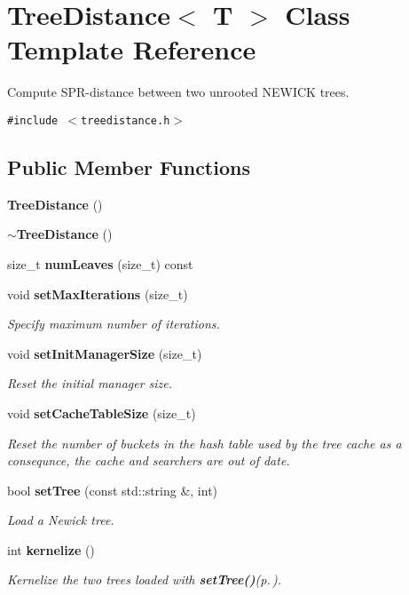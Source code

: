 \section{Tree\-Distance$<$ T $>$ Class Template Reference}
\label{classTreeDistance}
Compute SPR-distance between two unrooted NEWICK trees.  


{\tt \#include $<$treedistance.h$>$}

\subsection*{Public Member Functions}
\begin{CompactItemize}
\item 
{\bf Tree\-Distance} ()
\item 
{\bf $\sim$Tree\-Distance} ()
\item 
size\_\-t {\bf num\-Leaves} (size\_\-t) const 
\item 
void {\bf set\-Max\-Iterations} (size\_\-t)
\begin{CompactList}\small\item\em Specify maximum number of iterations. \item\end{CompactList}\item 
void {\bf set\-Init\-Manager\-Size} (size\_\-t)
\begin{CompactList}\small\item\em Reset the initial manager size. \item\end{CompactList}\item 
void {\bf set\-Cache\-Table\-Size} (size\_\-t)
\begin{CompactList}\small\item\em Reset the number of buckets in the hash table used by the tree cache as a consequnce, the cache and searchers are out of date. \item\end{CompactList}\item 
bool {\bf set\-Tree} (const std::string \&, int)
\begin{CompactList}\small\item\em Load a Newick tree. \item\end{CompactList}\item 
int {\bf kernelize} ()
\begin{CompactList}\small\item\em Kernelize the two trees loaded with {\bf set\-Tree()}{\rm (p.\,\pageref{classTreeDistance_a6})}. \item\end{CompactList}\item 

\end{CompactItemize}
